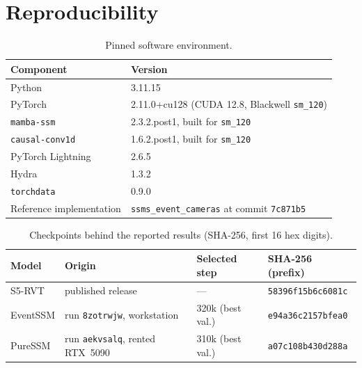 \documentclass[11pt, a4paper]{report}
\begin{document}
\chapter{Reproducibility}
\label{app:repro}
\begin{table}[htbp]
\centering
\small
\caption{Pinned software environment.}
\label{tab:env}
\begin{tabular}{ll}
\toprule
Component & Version \\
\midrule
Python & 3.11.15 \\
PyTorch & 2.11.0+cu128 (CUDA 12.8, Blackwell \texttt{sm\_120}) \\
\texttt{mamba-ssm} & 2.3.2.post1, built for \texttt{sm\_120} \\
\texttt{causal-conv1d} & 1.6.2.post1, built for \texttt{sm\_120} \\
PyTorch Lightning & 2.6.5 \\
Hydra & 1.3.2 \\
\texttt{torchdata} & 0.9.0 \\
Reference implementation & \texttt{ssms\_event\_cameras} at commit \texttt{7c871b5} \\
\bottomrule
\end{tabular}
\end{table}
\begin{table}[htbp]
\centering
\small
\caption{Checkpoints behind the reported results (SHA-256, first 16 hex digits).}
\label{tab:ckpts}
\begin{tabular}{llll}
\toprule
Model & Origin & Selected step & SHA-256 (prefix) \\
\midrule
S5-RVT & published release~\cite{zubic2024state} & --- & \texttt{58396f15b6c6081c} \\
EventSSM & run \texttt{8zotrwjw}, workstation & 320k (best val.) & \texttt{e94a36c2157bfea0} \\
PureSSM & run \texttt{aekvsalq}, rented RTX~5090 & 310k (best val.) & \texttt{a07c108b430d288a} \\
\bottomrule
\end{tabular}
\end{table}
\end{document}
